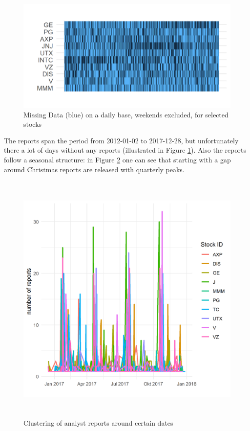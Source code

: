 \begin{figure}[h!]
\centering
\includegraphics[width=\textwidth]{figures/MissingDaysPlot.png}
\caption{Missing Data (blue) on a daily base, weekends excluded, for selected stocks}
\label{fig:MissingDays}
\end{figure}
The reports span the period from 2012-01-02 to 2017-12-28, but unfortunately there a lot of days without any reports (illustrated in Figure \ref{fig:MissingDays}). Also the reports follow a seasonal structure: in Figure \ref{fig:ClusterReport} one can see that starting with a gap around Christmas reports are released with quarterly peaks.

\begin{figure}[h!]
\centering
\begin{adjustbox}{width=0.85\textwidth,center, scale={1}{0.9}}
\includegraphics[width=\textwidth, height= 5in]{figures/SeasonalityReports.png}
\end{adjustbox}
\caption{Clustering of analyst reports around certain dates}
\label{fig:ClusterReport}
\end{figure}


